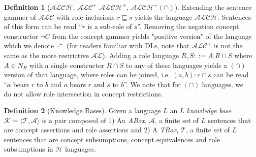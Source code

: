 \documentclass[letterpaper]{article} %
\theoremstyle{definition}
\theoremstyle{definition}
\newtheorem{definition}{Definition}
\theoremstyle{definition}
\theoremstyle{definition}
\theoremstyle{definition}
\newcommand{\isa}{\mathbin{{:}}}
\begin{document}
\begin{definition}[$\mathcal{ALCH}$, $\mathcal{ALC}^+$ $\mathcal{ALCH^+}$, $\mathcal{ALCH^+(\cap)}$]
Extending the sentence gammer of $\mathcal{ALC}$ with role inclusions $r \sqsubseteq s$ yields the language $\mathcal{ALCH}$. Sentences of this form can be read ``$r$ is a sub-role of $s$''. Removing the negation concept constructor $\lnot C$ from the concept gammer yields "positive version" of the language which we denote $\cdot^+$ (for readers familiar with DLs, note that $\mathcal{ALC^+}$ is not the same as the more restrictive $\mathcal{AL}$). Adding a role language $R,S::= A |R \sqcap S$ where $A \in N_R$ with a single constructor $R \cap S$ to any of these languages yields a $(\cap)$ version of that language, where roles can be joined, i.e. $(a, b) \isa r \cap s$ can be read ``$a$ bears $r$ to $b$ and $a$ bears $r$ and $s$ to $b$''. We note that for $(\cap)$ languages, we do not allow role intersection in concept restrictions.
\end{definition}

\begin{definition}[Knowledge Bases]
    Given a language $L$ an $L$ \textit{knowledge base} $\mathcal{K} = \langle\mathcal{T}, \mathcal{A}\rangle$ is a pair composed of 1) An \textit{ABox}, $\mathcal{A}$, a finite set of $L$ sentences that are concept assertions and role assertions and 2) A {\it TBox}, $\mathcal{T}$, a finite set of $L$ sentences that are concept subsumptions, concept equivalences and role subsumptions in $\mathcal{H}$ languages.
\end{definition}

\end{document}
